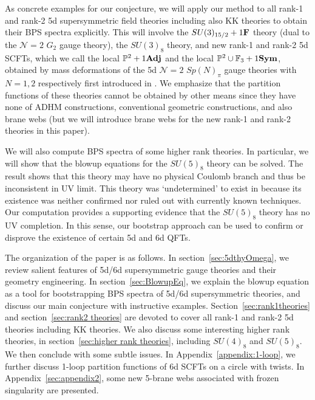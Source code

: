 As concrete examples for our conjecture, we will apply our method to all rank-1 and rank-2 5d supersymmetric field theories including also KK theories to obtain their BPS spectra explicitly. This will involve the $SU(3)_{15/2}+1{\bf F}$ theory (dual to the $\mathcal{N}=2$ $G_2$ gauge theory), the $SU(3)_8$ theory, and new rank-1 and rank-2 5d SCFTs, which we call the local $\mathbb{P}^2+1{\bf Adj}$ and the local $\mathbb{P}^2\cup \mathbb{F}_3+1{\bf Sym}$, obtained by mass deformations of the 5d $\mathcal{N}=2$ $Sp(N)_\pi$ gauge theories with $N=1,2$ respectively first introduced in \cite{Bhardwaj:2019jtr}. We emphasize that the partition functions of these theories cannot be obtained by other means since they have none of ADHM constructions, conventional geometric constructions, and also brane webs (but we will introduce brane webs for the new rank-1 and rank-2 theories in this paper).

We will also compute BPS spectra of some higher rank theories. In particular, we will show that the blowup equations for the $SU(5)_8$ theory can be solved. The result shows that this theory may have no physical Coulomb branch and thus be inconsistent in UV limit. This theory was `undetermined' to exist in \cite{Bhardwaj:2020gyu} because its existence was neither confirmed nor ruled out with currently known techniques. Our computation provides a supporting evidence that the $SU(5)_8$ theory has no UV completion. In this sense, our bootstrap approach can be used to confirm or disprove the existence of certain 5d and 6d QFTs. \bigskip

The organization of the paper is as follows. In section~\ref{sec:5dthyOmega}, we review salient features of 5d/6d supersymmetric gauge theories and their geometry engineering. In section~\ref{sec:BlowupEq}, we explain the blowup equation as a tool for bootstrapping BPS spectra of 5d/6d supersymmetric theories, and discuss our main conjecture with instructive examples. Section~\ref{sec:rank1theories} and section~\ref{sec:rank2 theories} are devoted to cover all rank-1 and rank-2 5d theories including KK theories. We also discuss some interesting higher rank theories, in section~\ref{sec:higher rank theories}, including $SU(4)_8$ and $SU(5)_8$. We then conclude with some subtle issues. In Appendix~\ref{appendix:1-loop}, we further discuss 1-loop partition functions of 6d SCFTs on a circle with twists. In Appendix~\ref{sec:appendix2}, some new 5-brane webs associated with frozen singularity are presented. \bigskip

